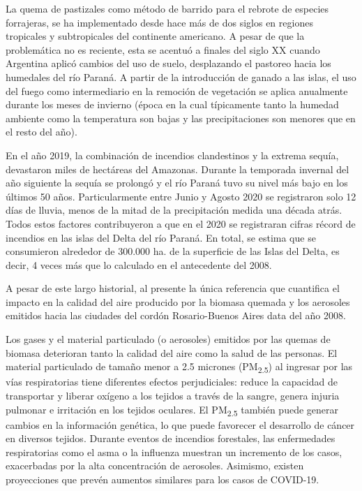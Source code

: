 La quema de pastizales como método de barrido para el rebrote de especies forrajeras, se ha implementado desde hace más de dos siglos en regiones tropicales y subtropicales del continente americano\cite{quemas_2008,SNMF_2020,molinas_2020,atlas_radiacion_colombia_2005,henry_2010}. A pesar de que la problemática no es reciente, esta se acentuó a finales del siglo XX cuando Argentina aplicó cambios del uso de suelo, desplazando el pastoreo hacia los humedales del río Paraná\cite{vazquez_2017}. A partir de la introducción de ganado a las islas, el uso del fuego como intermediario en la remoción de vegetación se aplica anualmente durante los meses de invierno  (época en la cual típicamente tanto la humedad ambiente como la temperatura son bajas y las precipitaciones son menores que en el resto del año)\cite{global_solar_uv_index_2002}.

En el año 2019, la combinación de incendios clandestinos y la extrema sequía, devastaron miles de hectáreas del Amazonas\cite{Estupin_1996,Holick_1989}. Durante la temporada invernal del año siguiente la sequía se prolongó y el río Paraná tuvo su nivel más bajo en los últimos 50 años. Particularmente entre Junio y Agosto 2020 se registraron solo 12 días de lluvia, menos de la mitad de la precipitación medida una década atrás. Todos estos factores contribuyeron a que en el 2020 se registraran cifras récord de incendios en las islas del Delta del río Paraná\cite{Holick_2004}. En total, se estima que se consumieron alrededor de 300.000 ha. de la superficie de las Islas del Delta\cite{pagina_12}, es decir, 4 veces más que lo calculado en el antecedente del 2008\cite{quemas_2008}.

A pesar de este largo historial, al presente la única referencia que cuantifica el impacto en la calidad del aire producido por la biomasa quemada y los aerosoles emitidos hacia las ciudades del cordón Rosario-Buenos Aires data del año 2008\cite{Chameides1999}.

Los gases y el material particulado (o aerosoles) emitidos por las quemas de biomasa deterioran tanto la calidad del aire como la salud de las personas. El material particulado de tamaño menor a 2.5 micrones (PM\textsubscript{2.5}) al ingresar por las vías respiratorias tiene diferentes efectos perjudiciales: reduce la capacidad de transportar y liberar oxígeno a los tejidos a través de la sangre, genera injuria pulmonar e irritación en los tejidos oculares. El PM\textsubscript{2.5} también puede generar cambios en la información genética, lo que puede favorecer el desarrollo de cáncer en diversos tejidos\cite{molinas_2020}. Durante eventos de incendios forestales, las enfermedades respiratorias como el asma o la influenza muestran un incremento de los casos, exacerbadas por la alta concentración de aerosoles. Asimismo, existen proyecciones que prevén aumentos similares para los casos de COVID-19\cite{CIE_2014}.


